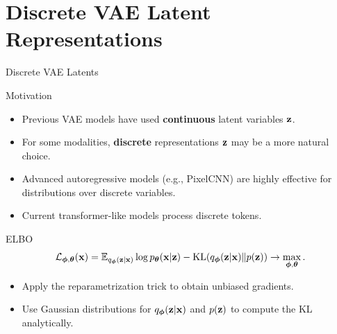 \documentclass{beamer}
\begin{document}
\section{Discrete VAE Latent Representations}
\begin{frame}{Discrete VAE Latents}
	\begin{block}{Motivation}
		\begin{itemize}
			\item Previous VAE models have used \textbf{continuous} latent variables $\mathbf{z}$.
			\item For some modalities, \textbf{discrete} representations $\mathbf{z}$ may be a more natural choice.
			\item Advanced autoregressive models (e.g., PixelCNN) are highly effective for distributions over discrete variables.
			\item Current transformer-like models process discrete tokens.
		\end{itemize}
	\end{block}
	\eqpause
	\begin{block}{ELBO}
		\vspace{-0.3cm}
		\[
			\mathcal{L}_{\boldsymbol{\phi}, \boldsymbol{\theta}}(\mathbf{x})  = \mathbb{E}_{q_{\boldsymbol{\phi}}(\mathbf{z}| \mathbf{x})} \log p_{\boldsymbol{\theta}}(\mathbf{x}| \mathbf{z}) - \mathrm{KL}(q_{\boldsymbol{\phi}}(\mathbf{z}| \mathbf{x}) \| p(\mathbf{z})) \rightarrow \max_{\boldsymbol{\phi}, \boldsymbol{\theta}}.
		\]
		\vspace{-0.5cm}
	\end{block}
	\eqpause
	\begin{itemize}
		\item Apply the reparametrization trick to obtain unbiased gradients.
		\item Use Gaussian distributions for $q_{\boldsymbol{\phi}}(\mathbf{z}| \mathbf{x})$ and $p(\mathbf{z})$ to compute the KL analytically.
	\end{itemize}
\end{frame}
\end{document}

